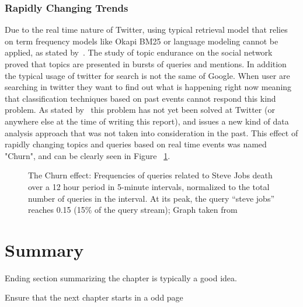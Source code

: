 \subsubsection{Rapidly Changing Trends} 
\label{sub:real_time_}
Due to the real time nature of Twitter, using typical retrieval model that relies on term frequency models like Okapi BM25 or language modeling cannot be applied, as stated by~\citet{Lin2012}. The study of topic endurance on the social network proved that topics are presented in bursts of queries and mentions. In addition the typical usage of twitter for search is not the same of Google. When user are searching in twitter they want to find out what is happening right now meaning that classification techniques based on past events cannot respond this kind problem. As stated by~\citet{Lin2012} this problem has not yet been solved at Twitter (or anywhere else at the time of writing this report), and issues a new kind of data analysis approach that was not taken into consideration in the past. 
This effect of rapidly changing topics and queries based on real time events was named "Churn", and can be clearly seen in Figure ~\ref{fig:churn}.

  \begin{figure}[tb]
    \begin{center}
    \noindent{}
    \end{center}
    \caption{The Churn effect: Frequencies of queries related to Steve Jobs death over a 12 hour period in 5-minute intervals, normalized to the total number of queries in the interval. At its peak, the query “steve jobs” reaches 0.15 (15\% of the query stream); Graph taken from~\cite{Lin2012}}
    \label{fig:churn}
  \end{figure}


\section{Summary}
Ending section summarizing the chapter is typically a good idea.

Ensure that the next chapter starts in a odd page
\cleardoublepage 
